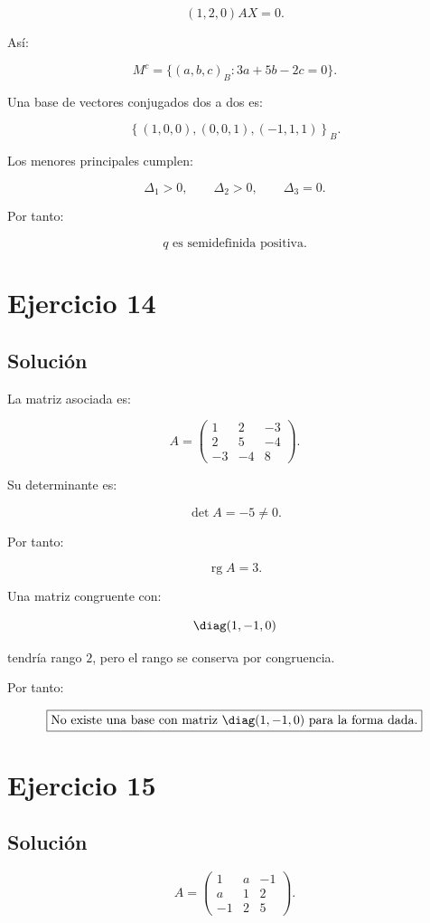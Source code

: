 \documentclass[11pt,a4paper]{article}
\newcommand{\rg}{\operatorname{rg}}
\begin{document}
\[
(1,2,0)AX=0.
\]

Así:

\[
\boxed{
M^c=
\{(a,b,c)_B:3a+5b-2c=0\}.
}
\]

Una base de vectores conjugados dos a dos es:

\[
\boxed{
\left\{
(1,0,0),
(0,0,1),
(-1,1,1)
\right\}_B.
}
\]

Los menores principales cumplen:

\[
\Delta_1>0,
\qquad
\Delta_2>0,
\qquad
\Delta_3=0.
\]

Por tanto:

\[
\boxed{
q\text{ es semidefinida positiva}.
}
\]

\section{Ejercicio 14}
\subsection{Solución}

La matriz asociada es:

\[
A=
\begin{pmatrix}
1&2&-3\\
2&5&-4\\
-3&-4&8
\end{pmatrix}.
\]

Su determinante es:

\[
\det A=-5\neq0.
\]

Por tanto:

\[
\rg A=3.
\]

Una matriz congruente con:

\[
\diag(1,-1,0)
\]

tendría rango $2$, pero el rango se conserva por congruencia.

Por tanto:

\[
\boxed{
\text{No existe una base con matriz }\diag(1,-1,0)
\text{ para la forma dada}.
}
\]

\section{Ejercicio 15}
\subsection{Solución}

\[
A=
\begin{pmatrix}
1&a&-1\\
a&1&2\\
-1&2&5
\end{pmatrix}.
\]
\end{document}
